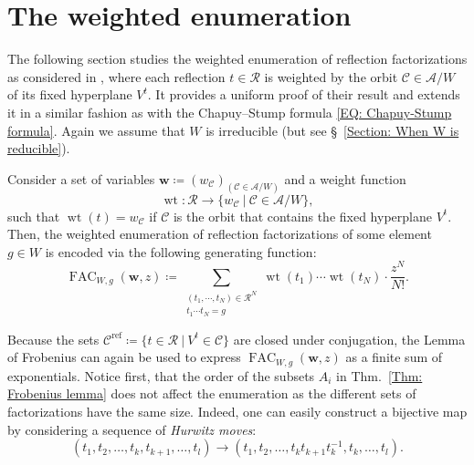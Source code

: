 \documentclass[ALCO, Unicode]{cedram}
\newcommand{\op}[1]{\operatorname{#1}}
\newcommand{\op}[1]{\operatorname{#1}}
\begin{document}
\section{The weighted enumeration}
\label{Section: The weighted enumeration}

The following section studies the weighted enumeration of reflection factorizations as considered in \cite{reiner-delMas-Hameister}, where each reflection $t\in\mathcal{R}$ is weighted by the orbit $\mathcal{C}\in\mathcal{A}/W$ of its fixed hyperplane $V^t$. It provides a uniform proof of their result and extends it in a similar fashion as with the Chapuy--Stump formula \eqref{EQ: Chapuy-Stump formula}. Again we assume that $W$ is irreducible (but see \S~\ref{Section: When W is reducible}).

\begin{defi}\label{Defn: weight function}
Consider a set of variables $\bm w\coloneqq (w_{\mathcal{C}})_{(\mathcal{C}\in\mathcal{A}/W)}$ and a weight function $$\op{wt}:\mathcal{R}\rightarrow\{ w_{\mathcal{C}}\ |\ \mathcal{C}\in\mathcal{A}/W\},$$ such that $\op{wt}(t)=w_{\mathcal{C}}$ if $\mathcal{C}$ is the orbit that contains the fixed hyperplane $V^t$. Then, the weighted enumeration of reflection factorizations of some element $g\in W$ is encoded via the following generating function:
$$\op{FAC}_{W,g}(\bm w,z)\coloneqq \sum_{\substack{(t_1,\cdots,t_N)\in\mathcal{R}^N\\t_1\cdots t_N=g}}\op{wt}(t_1)\cdots\op{wt}(t_N)\cdot \dfrac{z^N}{N!}. $$
\end{defi}

Because the sets $\mathcal{C}^{\op{ref}}\coloneqq \{t\in\mathcal{R}\ |\ V^t\in\mathcal{C}\}$ are closed under conjugation, the Lemma of Frobenius can again be used to express $\op{FAC}_{W,g}(\bm w,z)$ as a finite sum of exponentials. Notice first, that the order of the subsets $A_i$ in Thm.~\ref{Thm: Frobenius lemma} does not affect the enumeration as the different sets of factorizations have the same size. Indeed, one can easily construct a bijective map by considering a sequence of {\it Hurwitz moves}:$$
(t_1,t_2,\ldots,t_k,t_{k+1},\ldots ,t_l)\rightarrow (t_1,t_2,\ldots,t_kt_{k+1}t_k^{-1},t_k,\ldots,t_l).$$  
\end{document}
